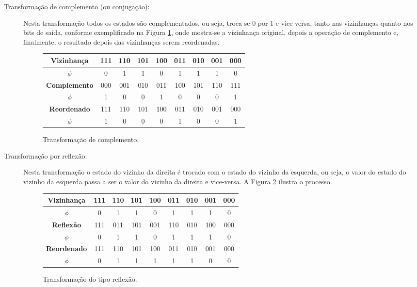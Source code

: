 \documentclass[12pt,a4paper]{article}
\begin{document}
\begin{description}

\item[Transformação de complemento (ou conjugação):] Nesta transformação
todos os estados são complementados, ou seja, troca-se 0 por 1 e vice-versa,
tanto nas vizinhanças quanto nos bits de saída,
conforme exemplificado na Figura \ref{fig:complement}, onde mostra-se
a vizinhança original, depois a operação de complemento e, finalmente,
o resultado depois das vizinhanças serem reordenadas.

\begin{figure}[htp]
\begin{center}
\begin{tabular}{|c|c|c|c|c|c|c|c|c|}
\hline
\textbf{Vizinhança}  & 111 & 110 & 101 & 100 & 011 & 010 & 001 & 000 \\ \hline
\textbf{$\phi$}      &  0  &  1  &  1  &  0  &  1  &  1  &  1  &  0  \\ \hline
\hline
\textbf{Complemento} & 000 & 001 & 010 & 011 & 100 & 101 & 110 & 111 \\ \hline
\textbf{$\phi$}      &  1  &  0  &  0  &  1  &  0  &  0  &  0  &  1  \\ \hline
\hline
\textbf{Reordenado}  & 111 & 110 & 101 & 100 & 011 & 010 & 001 & 000 \\ \hline
\textbf{$\phi$}      &  1  &  0  &  0  &  0  &  1  &  0  &  0  &  1  \\ \hline
\end{tabular}
\caption{Transformação de complemento.}
\label{fig:complement}
\end{center}
\end{figure}

\item[Transformação por reflexão:] Nesta transformação o estado do vizinho da direita é
trocado com o estado do vizinho da esquerda, ou seja, o valor do estado do vizinho
da esquerda passa a ser o valor do vizinho da direita e vice-versa.
A Figura \ref{fig:reflex} ilustra o processo.

\begin{figure}[htp]
\begin{center}
\begin{tabular}{|c|c|c|c|c|c|c|c|c|}
\hline
\textbf{Vizinhança}  & 111 & 110 & 101 & 100 & 011 & 010 & 001 & 000 \\ \hline
\textbf{$\phi$}      &  0  &  1  &  1  &  0  &  1  &  1  &  1  &  0  \\ \hline
\hline
\textbf{Reflexão}    & 111 & 011 & 101 & 001 & 110 & 010 & 100 & 000 \\ \hline
\textbf{$\phi$}      &  0  &  1  &  1  &  0  &  1  &  1  &  1  &  0  \\ \hline
\hline
\textbf{Reordenado}  & 111 & 110 & 101 & 100 & 011 & 010 & 001 & 000 \\ \hline
\textbf{$\phi$}      &  0  &  1  &  1  &  1  &  1  &  1  &  0  &  0  \\ \hline
\end{tabular}
\caption{Transformação do tipo reflexão.}
\label{fig:reflex}
\end{center}
\end{figure}


\end{description}
\end{document}
